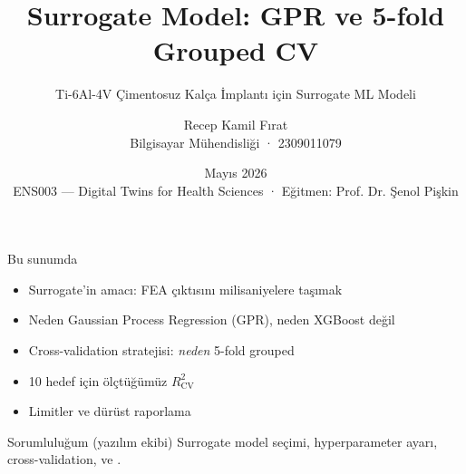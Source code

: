 

\newcommand{\courseHeader}{ENS003 --- Digital Twins for Health Sciences}
\newcommand{\courseSubheader}{İstinye Üniversitesi · Müh. ve Doğa Bilimleri Fakültesi}
\newcommand{\instructor}{Eğitmen: Prof. Dr. Şenol Pişkin}
\newcommand{\projectTitle}{Ti-6Al-4V Çimentosuz Kalça İmplantı için Surrogate ML Modeli}

\title{Surrogate Model: GPR ve 5-fold Grouped CV}
\subtitle{\projectTitle}
\author{Recep Kamil Fırat \\ \small Bilgisayar Mühendisliği · 2309011079}
\date{Mayıs 2026 \\ \scriptsize \courseHeader{} · \instructor}



\maketitle

\begin{frame}{Bu sunumda}
  \begin{itemize}
    \item Surrogate'in amacı: FEA çıktısını milisaniyelere taşımak
    \item Neden Gaussian Process Regression (GPR), neden XGBoost değil
    \item Cross-validation stratejisi: \textit{neden} 5-fold grouped
    \item 10 hedef için ölçtüğümüz \(R^2_{\text{CV}}\)
    \item Limitler ve dürüst raporlama
  \end{itemize}
  \vspace{0.4cm}
  \begin{block}{Sorumluluğum (yazılım ekibi)}
    Surrogate model seçimi, hyperparameter ayarı, cross-validation,
     ve .
  \end{block}
\end{frame}

